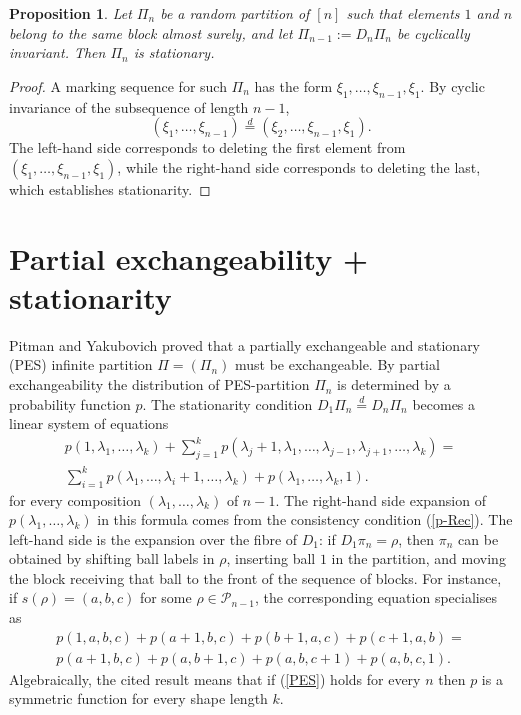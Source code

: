 \documentclass{article}
\newtheorem{proposition}{Proposition}
\begin{document}
\begin{proposition}
Let $\Pi_n$ be a random partition of $[n]$ such that elements $1$ and $n$ belong to the same block almost surely, and let
$\Pi_{n-1} := D_n\Pi_n$ be cyclically invariant. 
Then $\Pi_n$ is stationary.
\end{proposition}

\begin{proof}
A marking sequence for such $\Pi_n$ has the form $\xi_1, \ldots, \xi_{n-1}, \xi_1$.
By cyclic invariance of the subsequence of length $n-1$,
\[
(\xi_1, \ldots, \xi_{n-1}) \stackrel{d}{=} (\xi_2, \ldots, \xi_{n-1}, \xi_1).
\]
The left-hand side corresponds to deleting the first element from $(\xi_1, \ldots, \xi_{n-1}, \xi_1)$, while the right-hand side corresponds to deleting the last, which establishes stationarity.
\end{proof}



\section{Partial exchangeability + stationarity}

\noindent
Pitman and Yakubovich \cite{PY} proved that 
a partially exchangeable and stationary (PES) infinite partition $\Pi=(\Pi_n)$ must be exchangeable.
By partial exchangeability 
the distribution of PES-partition $\Pi_n$ is determined by a probability function $p$. The stationarity condition $D_1\Pi_n\stackrel{d}{=} D_n\Pi_n$  
becomes a linear system of equations
\begin{eqnarray}\nonumber
p(1, \lambda_1, \dots, \lambda_k) + \sum_{j=1}^{k} p(\lambda_j + 1, \lambda_1, \dots, \lambda_{j-1}, \lambda_{j+1}, \dots, \lambda_k) =\\   \label{PES}
 \sum_{i=1}^{k} p(\lambda_1, \dots, \lambda_i + 1, \dots, \lambda_k)+ p(\lambda_1, \dots, \lambda_k, 1).
\end{eqnarray}
for every composition $(\lambda_1,\ldots,\lambda_k)$ of $n-1$. The right-hand side expansion of 
$p(\lambda_1, \dots, \lambda_k)$ 
in this formula comes from  the consistency condition  (\ref{p-Rec}). The left-hand side is the expansion over the fibre
of $D_1$: if $D_1\pi_n=\rho$, then 
$\pi_n$ can be obtained by shifting  ball labels in $\rho$, inserting ball $1$ in the partition, and moving the block receiving that ball to the front of the sequence of blocks.
For instance, if  $s(\rho)=(a,b,c)$ for some $\rho\in{\mathcal P}_{n-1}$, the corresponding equation specialises as
\begin{eqnarray*}
p(1,a,b,c)+p(a+1,b,c)+p(b+1,a,c)+p(c+1,a,b)=\\p(a+1,b,c)+p(a,b+1,c)+p(a,b,c+1)+p(a,b,c,1).
\end{eqnarray*}
Algebraically, the cited result 
means that if (\ref{PES})  holds for every $n$ then $p$ is a symmetric function for every shape length $k$.
\end{document}
